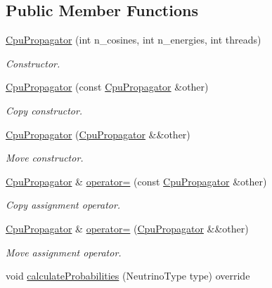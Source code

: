 \subsection*{Public Member Functions}
\begin{DoxyCompactItemize}
\item 
\hyperlink{classcudaprob3_1_1CpuPropagator_a0ba41c470627201c01d10983d785beea}{Cpu\+Propagator} (int n\+\_\+cosines, int n\+\_\+energies, int threads)
\begin{DoxyCompactList}\small\item\em Constructor. \end{DoxyCompactList}\item 
\hyperlink{classcudaprob3_1_1CpuPropagator_a344dc85d696677ffa2692b22a6bbea44}{Cpu\+Propagator} (const \hyperlink{classcudaprob3_1_1CpuPropagator}{Cpu\+Propagator} \&other)
\begin{DoxyCompactList}\small\item\em Copy constructor. \end{DoxyCompactList}\item 
\hyperlink{classcudaprob3_1_1CpuPropagator_a41038629d7e329e175e09cabbf386975}{Cpu\+Propagator} (\hyperlink{classcudaprob3_1_1CpuPropagator}{Cpu\+Propagator} \&\&other)
\begin{DoxyCompactList}\small\item\em Move constructor. \end{DoxyCompactList}\item 
\hyperlink{classcudaprob3_1_1CpuPropagator}{Cpu\+Propagator} \& \hyperlink{classcudaprob3_1_1CpuPropagator_a6b5b29810d22ca383ed9f617beec1523}{operator=} (const \hyperlink{classcudaprob3_1_1CpuPropagator}{Cpu\+Propagator} \&other)
\begin{DoxyCompactList}\small\item\em Copy assignment operator. \end{DoxyCompactList}\item 
\hyperlink{classcudaprob3_1_1CpuPropagator}{Cpu\+Propagator} \& \hyperlink{classcudaprob3_1_1CpuPropagator_ac612a070291f5cad723ce1bdbee3d602}{operator=} (\hyperlink{classcudaprob3_1_1CpuPropagator}{Cpu\+Propagator} \&\&other)
\begin{DoxyCompactList}\small\item\em Move assignment operator. \end{DoxyCompactList}\item 
void \hyperlink{classcudaprob3_1_1CpuPropagator_adfd6a6c86a5992bce66d0bcf975bc17d}{calculate\+Probabilities} (Neutrino\+Type type) override

\end{DoxyCompactItemize}
